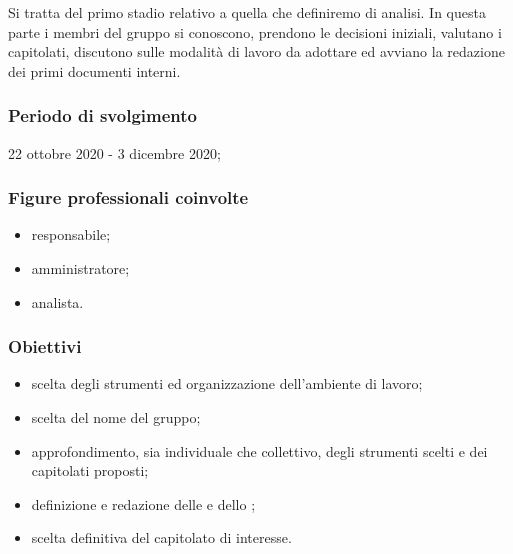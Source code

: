 Si tratta del primo stadio relativo a quella che definiremo  di analisi. In questa parte i membri del gruppo si conoscono, prendono le decisioni iniziali, valutano i capitolati, discutono sulle modalità di lavoro da adottare ed avviano la redazione dei primi documenti interni.
        
        \subsubsection{Periodo di svolgimento}
        22 ottobre 2020 - 3 dicembre 2020;
        
        \subsubsection{Figure professionali coinvolte}
            \begin{itemize}
                \item responsabile;
                \item amministratore;
                \item analista.
            \end{itemize}
        
        \subsubsection{Obiettivi}
            \begin{itemize}
                \item scelta degli strumenti ed organizzazione dell'ambiente di lavoro;
                \item scelta del nome del gruppo;
                \item approfondimento, sia individuale che collettivo, degli strumenti scelti e dei capitolati proposti;
                \item definizione e redazione delle \NdP{} e dello \glo{\SdF{}};
                \item scelta definitiva del capitolato di interesse.
            \end{itemize}
